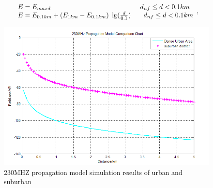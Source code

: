 \documentclass[runningheads,a4paper]{llncs}
\begin{document}
{\begin{equation}
\begin{array}{l}
E = {E_{maxd}}{\kern 1pt} {\kern 1pt} {\kern 1pt} {\kern 1pt} {\kern 1pt} {\kern 1pt} {\kern 1pt} {\kern 1pt} {\kern 1pt} {\kern 1pt} {\kern 1pt} {\kern 1pt} {\kern 1pt} {\kern 1pt} {\kern 1pt} {\kern 1pt} {\kern 1pt} {\kern 1pt} {\kern 1pt} {\kern 1pt} {\kern 1pt} {\kern 1pt} {\kern 1pt} {\kern 1pt} {\kern 1pt} {\kern 1pt} {\kern 1pt} {\kern 1pt} {\kern 1pt} {\kern 1pt} {\kern 1pt} {\kern 1pt} {\kern 1pt} {\kern 1pt} {\kern 1pt} {\kern 1pt} {\kern 1pt} {\kern 1pt} {\kern 1pt} {\kern 1pt} {\kern 1pt} {\kern 1pt} {\kern 1pt} {\kern 1pt} {\kern 1pt} {\kern 1pt} {\kern 1pt} {\kern 1pt} {\kern 1pt} {\kern 1pt} {\kern 1pt} {\kern 1pt} {\kern 1pt} {\kern 1pt} {\kern 1pt} {\kern 1pt} {\kern 1pt} {\kern 1pt} {\kern 1pt} {\kern 1pt} {\kern 1pt} {\kern 1pt} {\kern 1pt} {\kern 1pt} {\kern 1pt} {\kern 1pt} {\kern 1pt} {\kern 1pt} {\kern 1pt} {\kern 1pt} {\kern 1pt} {\kern 1pt} {\kern 1pt} {\kern 1pt} {\kern 1pt} {\kern 1pt} {\kern 1pt} {\kern 1pt} {\kern 1pt} {\kern 1pt} {\kern 1pt} {\kern 1pt} {\kern 1pt} {\kern 1pt} {\kern 1pt} {\kern 1pt} {\kern 1pt} {\kern 1pt} {\kern 1pt} {\kern 1pt} {\kern 1pt} {\kern 1pt} {\kern 1pt} {\kern 1pt} {\kern 1pt} {\kern 1pt} {\kern 1pt} {\kern 1pt} {\kern 1pt} {\kern 1pt} {\kern 1pt} {\kern 1pt} {\kern 1pt} {\kern 1pt} {\kern 1pt} {\kern 1pt} {\kern 1pt} {\kern 1pt} {\kern 1pt} {\kern 1pt} {\kern 1pt} {\kern 1pt} {\kern 1pt} {\kern 1pt} {\kern 1pt} {\kern 1pt} {\kern 1pt} {\kern 1pt} {\kern 1pt} {\kern 1pt} {\kern 1pt} {\kern 1pt} {\kern 1pt} {\kern 1pt} {\kern 1pt} {\kern 1pt} {\kern 1pt} {\kern 1pt} {\kern 1pt} {\kern 1pt} {\kern 1pt} {\kern 1pt} {\kern 1pt} {\kern 1pt} {d_{nf}} \le d < 0.1km\\
E = {E_{0.1km}} + ({E_{1km}} - {E_{0.1km}}){\kern 1pt} {\kern 1pt} {\kern 1pt} \lg (\frac{d}{{0.1}}){\kern 1pt} {\kern 1pt} {\kern 1pt} {\kern 1pt} {\kern 1pt} {\kern 1pt} {\kern 1pt} {\kern 1pt} {\kern 1pt} {\kern 1pt} {\kern 1pt} {\kern 1pt} {\kern 1pt} {\kern 1pt} {\kern 1pt} {\kern 1pt} {\kern 1pt} {\kern 1pt} {\kern 1pt} {d_{nf}} \le d < 0.1km
\end{array}, \label{keurough} \end{equation}

\begin{figure}
\centerline{\includegraphics[width=15cm]{urbancountry.png}}
\caption{230MHZ propagation model simulation results of urban and suburban }
\end{figure}

}
\end{document}
